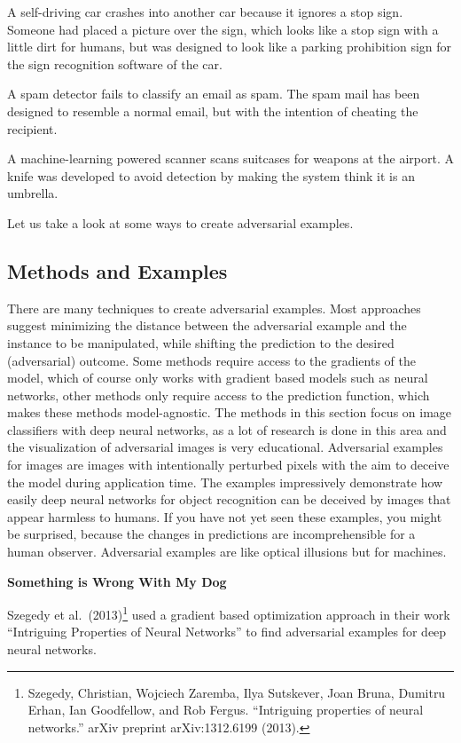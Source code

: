 \documentclass[
  11pt,
]{scrbook}
\begin{document}
A self-driving car crashes into another car because it ignores a stop sign.
Someone had placed a picture over the sign, which looks like a stop sign with a little dirt for humans, but was designed to look like a parking prohibition sign for the sign recognition software of the car.

A spam detector fails to classify an email as spam.
The spam mail has been designed to resemble a normal email, but with the intention of cheating the recipient.

A machine-learning powered scanner scans suitcases for weapons at the airport.
A knife was developed to avoid detection by making the system think it is an umbrella.

Let us take a look at some ways to create adversarial examples.

\hypertarget{methods-and-examples}{%
\subsection{Methods and Examples}\label{methods-and-examples}}

There are many techniques to create adversarial examples.
Most approaches suggest minimizing the distance between the adversarial example and the instance to be manipulated, while shifting the prediction to the desired (adversarial) outcome.
Some methods require access to the gradients of the model, which of course only works with gradient based models such as neural networks, other methods only require access to the prediction function, which makes these methods model-agnostic.
The methods in this section focus on image classifiers with deep neural networks, as a lot of research is done in this area and the visualization of adversarial images is very educational.
Adversarial examples for images are images with intentionally perturbed pixels with the aim to deceive the model during application time.
The examples impressively demonstrate how easily deep neural networks for object recognition can be deceived by images that appear harmless to humans.
If you have not yet seen these examples, you might be surprised, because the changes in predictions are incomprehensible for a human observer.
Adversarial examples are like optical illusions but for machines.

\textbf{Something is Wrong With My Dog}

Szegedy et al.~(2013)\footnote{Szegedy, Christian, Wojciech Zaremba, Ilya Sutskever, Joan Bruna, Dumitru Erhan, Ian Goodfellow, and Rob Fergus. ``Intriguing properties of neural networks.'' arXiv preprint arXiv:1312.6199 (2013).} used a gradient based optimization approach in their work ``Intriguing Properties of Neural Networks'' to find adversarial examples for deep neural networks.
\end{document}
